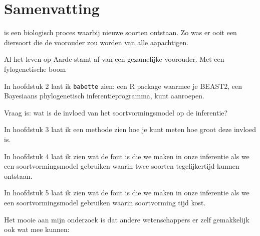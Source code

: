 \chapter*{Samenvatting}

{



\noindent 
{} is een biologisch proces waarbij
nieuwe soorten ontstaan.
Zo was er ooit een diersoort die de voorouder zou worden
van alle aapachtigen.

Al het leven op Aarde stamt af van een gezamelijke voorouder.
Met een fylogenetische boom 

In hoofdstuk 2 laat ik \verb;babette; zien: een R package waarmee je BEAST2, 
een Bayesiaans phylogenetisch inferentieprogramma, kunt aanroepen.

Vraag is: wat is de invloed van het soortvormingsmodel op de inferentie?

In hoofdstuk 3 laat ik een methode zien hoe je kunt meten hoe groot deze invloed is.

In hoofdstuk 4 laat ik zien wat de fout is die we maken in onze inferentie als we
een soortvormingsmodel gebruiken waarin twee soorten tegelijkertijd kunnen ontstaan.

In hoofdstuk 5 laat ik zien wat de fout is die we maken in onze inferentie als we
een soortvormingsmodel gebruiken waarin soortvorming tijd kost.

Het mooie aan mijn onderzoek is dat andere wetenschappers er zelf gemakkelijk ook wat mee kunnen:


} %
